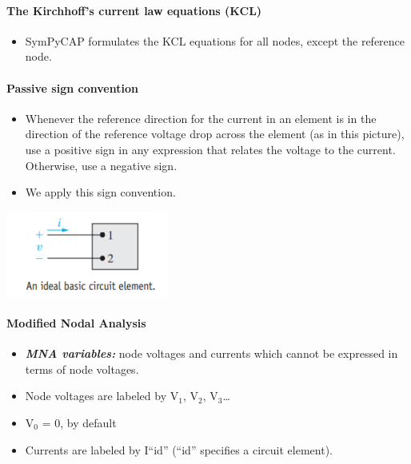 \documentclass[11pt]{article}
\providecommand{\tightlist}{%
      \setlength{\itemsep}{0pt}\setlength{\parskip}{0pt}}
\begin{document}
\hypertarget{the-kirchhoffs-current-law-equations-kcl}{%
\paragraph{The Kirchhoff's current law equations
(KCL)}\label{the-kirchhoffs-current-law-equations-kcl}}

\begin{itemize}
\tightlist
\item
  SymPyCAP formulates the KCL equations for all nodes, except the reference
  node.
\end{itemize}

\hypertarget{passive-sign-convention}{%
\paragraph{Passive sign convention}\label{passive-sign-convention}}



\begin{itemize}
\tightlist
\item Whenever the reference direction
for the current in an element is in the direction of the reference
voltage drop across the element (as in this picture), use a positive
sign in any expression that relates the voltage to the current.
Otherwise, use a negative sign.
\end{itemize}


\begin{itemize}
\tightlist
\item
  We apply this sign convention.
\end{itemize}

\begin{center} \includegraphics{PassiveSignConvention_picture.png} \end{center}

\hypertarget{modified-nodal-analysis}{%
\paragraph{Modified Nodal Analysis}\label{modified-nodal-analysis}}

\begin{itemize}
\tightlist
\item

\textit{\textbf{MNA variables:}} node voltages and currents which cannot be expressed in terms of node
voltages. 
\item Node voltages are labeled by V\(_1\), V\(_2\),
V\(_3\)\ldots{} 
\item V\(_0\) = 0, by default 
\item Currents are labeled by
I``id'' (``id'' specifies a circuit element).
\end{itemize}
\end{document}
